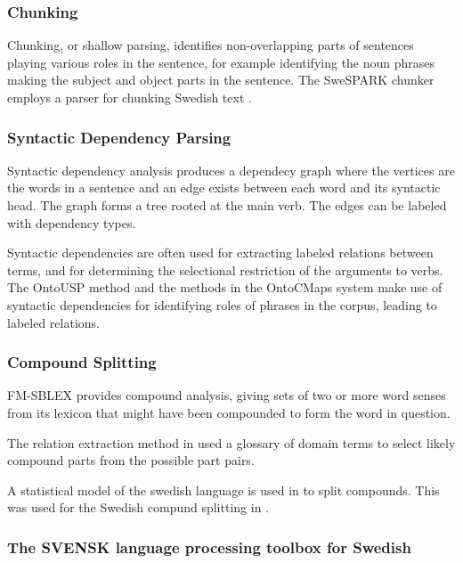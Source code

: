 \documentclass[a4paper]{report}
\begin{document}
\subsubsection{Chunking}

Chunking, or shallow parsing, identifies non-overlapping parts of sentences playing various roles in the sentence, for example identifying the noun phrases making the subject and object parts in the sentence.
The SweSPARK chunker employs a parser for chunking Swedish text \cite{Megyesi02Thesis}.

\subsubsection{Syntactic Dependency Parsing}

Syntactic dependency analysis produces a dependecy graph where the vertices are the words in a sentence and an edge exists between each word and its syntactic head.
The graph forms a tree rooted at the main verb.
The edges can be labeled with dependency types.

Syntactic dependencies are often used for extracting labeled relations between terms, and for determining the selectional restriction of the arguments to verbs.
The OntoUSP \citep{Poon2010OntoUSP} method and the methods in the OntoCMaps system \citep{Zouaq11OntoCmaps} make use of syntactic dependencies for identifying roles of phrases in the corpus, leading to labeled relations.

\subsubsection{Compound Splitting}

FM-SBLEX provides compound analysis, giving sets of two or more word senses from its lexicon that might have been compounded to form the word in question.

The relation extraction method in \cite{Kokkinakis08SolidComp} used a glossary of domain terms to select likely compound parts from the possible part pairs.

A statistical model of the swedish language is used in \citep{Sjobergh04Compounds} to split compounds. This was used for the Swedish compund splitting in \citep{Hjelm09Thesis}.

\subsubsection{The SVENSK language processing toolbox for Swedish}
\end{document}
